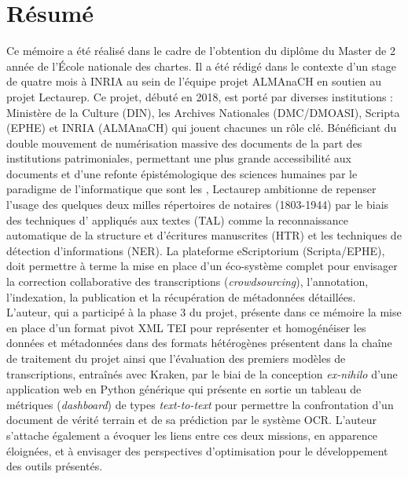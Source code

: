 \chapter*{Résumé}

Ce mémoire a été réalisé dans le cadre de l'obtention du diplôme du Master de 2 année  de l'École nationale des chartes. 
Il a été rédigé dans le contexte d'un stage de quatre mois à INRIA au sein de l'équipe projet ALMAnaCH en soutien au projet Lectaurep.
Ce projet, débuté en 2018, est porté par diverses institutions : Ministère de la Culture (DIN), les Archives Nationales (DMC/DMOASI), Scripta (EPHE) et INRIA (ALMAnaCH) qui jouent chacunes un rôle clé. 
Bénéficiant du double mouvement de numérisation massive des documents de la part des institutions patrimoniales, permettant une plus grande accessibilité aux documents et d'une refonte épistémologique des sciences humaines par le paradigme de l'informatique que sont les , Lectaurep ambitionne de repenser l'usage des quelques deux milles répertoires de notaires (1803-1944) par le biais des techniques d' appliqués aux textes (TAL) comme la reconnaissance automatique de la structure et d'écritures manuscrites (HTR) et les techniques de détection d'informations (NER). 
La plateforme eScriptorium (Scripta/EPHE), doit permettre à terme la mise en place d'un éco-système complet pour envisager la correction collaborative des transcriptions (\textit{crowdsourcing}), l'annotation, l'indexation, la publication et la récupération de métadonnées détaillées.
L'auteur, qui a participé à la phase 3 du projet, présente dans ce mémoire la mise en place d'un format pivot XML TEI pour représenter et homogénéiser les données et métadonnées dans des formats hétérogènes présentent dans la chaîne de traitement du projet ainsi que l'évaluation des premiers modèles de transcriptions, entraînés avec Kraken, par le biai de la conception \textit{ex-nihilo} d'une application web en Python générique qui présente en sortie un tableau de métriques (\textit{dashboard}) de types \textit{text-to-text} pour permettre la confrontation d'un document de vérité terrain et de sa prédiction par le système OCR.
L'auteur s'attache également a évoquer les liens entre ces deux missions, en apparence éloignées, et à envisager des perspectives d'optimisation pour le développement des outils présentés.


\bigskip

